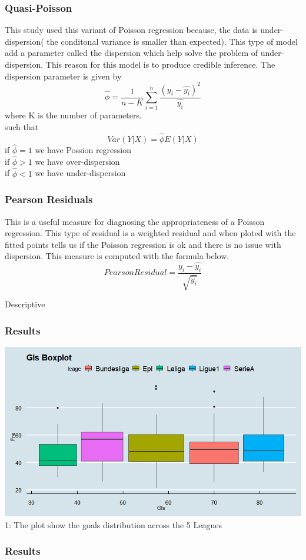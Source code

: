 \documentclass[11pt]{beamer}
\begin{document}
\begin{frame}
	\frametitle{Quasi-Poisson}
	This study used this variant of Poisson regression because, the data is under-dispersion( the conditonal variance is smaller than expected).
	This type of model add a parameter called the dispersion which help solve the problem of under-dispersion. This reason for this model is to produce credible inference. 
	The dispersion parameter is given by
	\[\hat{\phi}=\frac{1}{n-K}\sum_{i=1}^{n}\frac{(y_i-\hat{y_i})^2}{\hat{y_i}}\]
	where K is the number of parameters.\\
	such that
	\[Var(Y|X)=\hat{\phi}E(Y|X) \]
	if $\hat{\phi}=1$ we have Possion regression\\
	if $\hat{\phi}>1$ we have over-dispersion\\
	if $\hat{\phi}<1$ we have under-dispersion
	
\end{frame}
\begin{frame}
	\frametitle{Pearson Residuals}
	This is a useful measure for diagnosing the appropriateness of a Poisson regression. This type of residual is a weighted residual and when ploted with the fitted points tells us if the Poisson regression is ok and there is no issue with dispersion. This measure is computed with the formula below.
	\[Pearson Residual=\frac{y_i-\hat{y_i}}{\sqrt{\hat{y_i}}}\]  
\end{frame}

\begin{frame}{Descriptive}
	\frametitle{Results}
	\includegraphics[scale=0.5]{Gls}
	\figurename 1: The plot show the goals distribution across the 5 Leagues
\end{frame}

\begin{frame}
	\frametitle{Results}
	
\end{frame}
\end{document}
